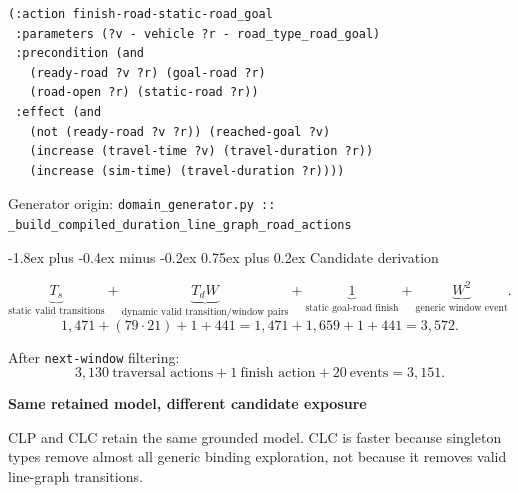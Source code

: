 \documentclass[11pt,a4paper]{article}
\makeatletter
\renewcommand{\subsection}{\@startsection{subsection}{2}{0pt}
  {-1.8ex plus -0.4ex minus -0.2ex}
  {0.75ex plus 0.2ex}
  {\normalfont\large\bfseries\color{RoutlyNavy}}}
\newcommand{\codeorigin}[1]{%
  {\footnotesize\textcolor{RoutlyMuted}{Generator origin: \texttt{#1}}\par}
}
\makeatother
\begin{document}
\begin{lstlisting}
(:action finish-road-static-road_goal
 :parameters (?v - vehicle ?r - road_type_road_goal)
 :precondition (and
   (ready-road ?v ?r) (goal-road ?r)
   (road-open ?r) (static-road ?r))
 :effect (and
   (not (ready-road ?v ?r)) (reached-goal ?v)
   (increase (travel-time ?v) (travel-duration ?r))
   (increase (sim-time) (travel-duration ?r))))
\end{lstlisting}
\codeorigin{domain\_generator.py ::\\
\_build\_compiled\_duration\_line\_graph\_road\_actions}

\subsection{Candidate derivation}

\[
\underbrace{T_s}_{\text{static valid transitions}}
+
\underbrace{T_dW}_{\text{dynamic valid transition/window pairs}}
+
\underbrace{1}_{\text{static goal-road finish}}
+
\underbrace{W^2}_{\text{generic window event}}.
\]
\[
1{,}471+(79\cdot21)+1+441
=1{,}471+1{,}659+1+441
=\boxed{3{,}572}.
\]

After \texttt{next-window} filtering:
\[
\boxed{3{,}130\ \text{traversal actions}
+1\ \text{finish action}
+20\ \text{events}
=3{,}151.}
\]

\begin{center}
{\small\bfseries\color{RoutlyOrange}
Same retained model, different candidate exposure\par}
\vspace{1mm}
\end{center}

\begin{defencebox}
CLP and CLC retain the same grounded model. CLC is faster because singleton
types remove almost all generic binding exploration, not because it removes
valid line-graph transitions.
\end{defencebox}
\end{document}
